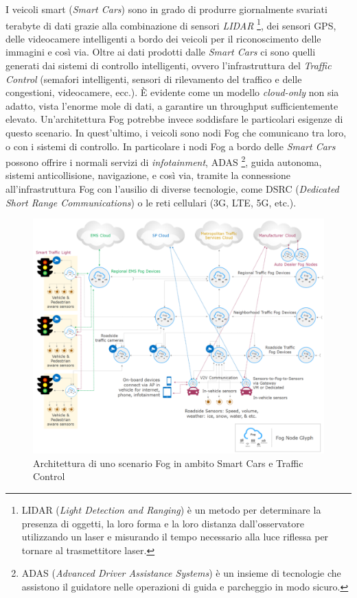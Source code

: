 I veicoli smart (\textit{Smart Cars}) sono in grado di produrre giornalmente svariati terabyte di dati grazie alla combinazione di sensori \textit{LIDAR} \footnote{LIDAR (\textit{Light Detection and Ranging}) è un metodo per determinare la presenza di oggetti, la loro forma e la loro distanza dall'osservatore utilizzando un laser e misurando il tempo necessario alla luce riflessa per tornare al trasmettitore laser.}, dei sensori GPS, delle videocamere intelligenti a bordo dei veicoli per il riconoscimento delle immagini e così via. Oltre ai dati prodotti dalle \textit{Smart Cars} ci sono quelli generati dai sistemi di controllo intelligenti, ovvero l'infrastruttura del \textit{Traffic Control} (semafori intelligenti, sensori di rilevamento del traffico e delle congestioni, videocamere, ecc.). È evidente come un modello \textit{cloud-only} non sia adatto, vista l'enorme mole di dati, a garantire un throughput sufficientemente elevato. Un'architettura Fog potrebbe invece soddisfare le particolari esigenze di questo scenario. In quest'ultimo, i veicoli sono nodi Fog che comunicano tra loro, o con i sistemi di controllo. In particolare i nodi Fog a bordo delle \textit{Smart Cars} possono offrire i normali servizi di \textit{infotainment}, ADAS \footnote{ADAS (\textit{Advanced Driver Assistance Systems}) è un insieme di tecnologie che assistono il guidatore nelle operazioni di guida e parcheggio in modo sicuro.}, guida autonoma, sistemi anticollisione, navigazione, e così via, tramite la connessione all'infrastruttura Fog con l'ausilio di diverse tecnologie, come DSRC (\textit{Dedicated Short Range Communications}) o le reti cellulari (3G, LTE, 5G, etc.).

\begin{figure}[!ht]
  \includegraphics[width=14cm]{images/smartcars_trafficcontrol}
  \centering
  \caption[Architettura di uno scenario Fog in ambito Smart Cars e Traffic Control]{Architettura di uno scenario Fog in ambito Smart Cars e Traffic Control \cite{OpenFogReferenceArchitecture}}
  \label{fig:smartcars_trafficcontrol}
\end{figure}

